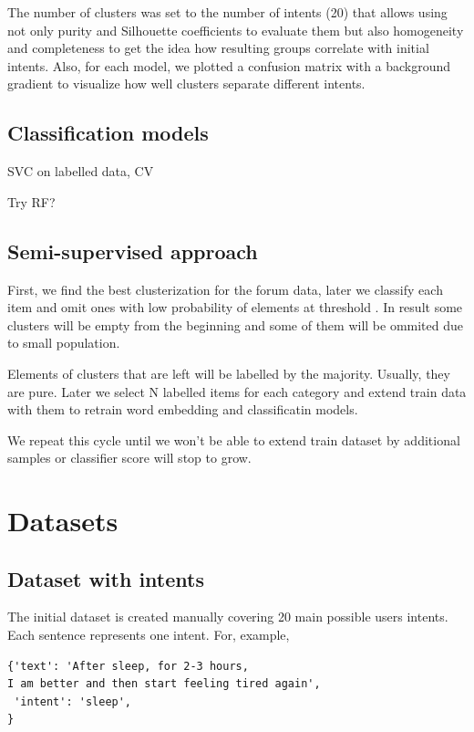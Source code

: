 \documentclass[11pt]{article}
\begin{document}
The number of clusters was set to the number of intents (20) that allows using not only purity and Silhouette coefficients to evaluate them but also homogeneity and completeness to get the idea how resulting groups correlate with initial intents. Also, for each model, we plotted a confusion matrix with a background gradient to visualize how well clusters separate different intents.

\subsection{Classification models}

SVC on labelled data, CV

Try RF?


\subsection{Semi-supervised approach}

First, we find the best clusterization for the forum data, later we classify each item and omit ones with low probability of elements at threshold \Theta. In result some clusters will be empty from the beginning and some of them will be ommited due to small population.

Elements of clusters that are left will be labelled by the majority. Usually, they are pure. Later we select N labelled items for each category and extend train data with them to retrain word embedding and classificatin models.

We repeat this cycle until we won't be able to extend train dataset by additional samples or classifier score will stop to grow.


\section{Datasets}

\subsection{Dataset with intents}

The initial dataset is created manually covering 20 main possible users intents. Each sentence represents one intent. For, example,

\begin{lstlisting}
{'text': 'After sleep, for 2-3 hours, 
I am better and then start feeling tired again',
 'intent': 'sleep',
}
\end{lstlisting}
\end{document}
